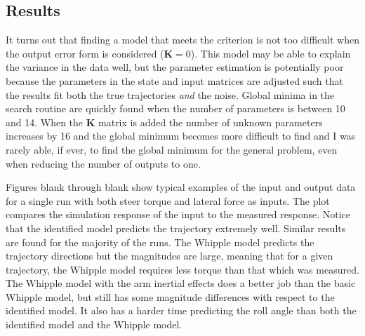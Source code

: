 \documentclass[a4paper]{article}
\begin{document}

\subsection{Results}


It turns out that finding a model that meets the criterion is not too difficult
when the output error form is considered ($\mathbf{K}=0$). This model may be
able to explain the variance in the data well, but the parameter estimation is
potentially poor because the parameters in the state and input matrices are
adjusted such that the results fit both the true trajectories \emph{and} the
noise. Global minima in the search routine are quickly found when the number of
parameters is between 10 and 14. When the $\mathbf{K}$ matrix is added the
number of unknown parameters increases by 16 and the global minimum becomes
more difficult to find and I was rarely able, if ever, to find the global
minimum for the general problem, even when reducing the number of outputs to
one.

Figures blank through blank show typical examples of the input and output data
for a single run with both steer torque and lateral force as inputs. The plot
compares the simulation response of the input to the measured response. Notice
that the identified model predicts the trajectory extremely well. Similar
results are found for the majority of the runs. The Whipple model predicts the
trajectory directions but the magnitudes are large, meaning that for a given
trajectory, the Whipple model requires less torque than that which was
measured. The Whipple model with the arm inertial effects does a better job
than the basic Whipple model, but still has some magnitude differences with
respect to the identified model. It also has a harder time predicting the roll
angle than both the identified model and the Whipple model.

\end{document}
